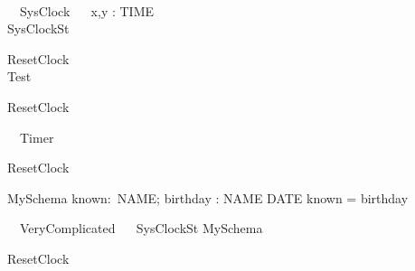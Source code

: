 \documentclass{llncs}
\begin{document}
\begin{circus}
\\
\circprocess\ ~SysClock ~\circdef~ x,y : TIME \circspot \circbegin\\
\circstate SysClockSt 
\end{circus}%
\begin{circusaction}
  ResetClock ~\circdef~\Skip\\
  Test ~\circdef~\Skip
\end{circusaction}
\begin{circus}
  \circspot ResetClock
  \circend
\end{circus}

\begin{circus}%
  \circprocess\ ~Timer ~\circdef~\circbegin
\end{circus}%
\begin{circusaction}
  ResetClock ~\circdef~\Skip
\end{circusaction}
\begin{circus}
  \circspot \Skip
  \circend
\end{circus}
\begin{schema}{MySchema}
known:\power~NAME; 
birthday : NAME \pfun DATE 
\where
known = \dom birthday\\
\end{schema}
\begin{circus}%
  \circprocess\ ~VeryComplicated ~\circdef~\circbegin
  \circstate SysClockSt  MySchema\\

\end{circus}%
\begin{circusaction}
  ResetClock ~\circdef~\Skip
\end{circusaction}
\begin{circus}
  \circspot \Skip
  \circend
\end{circus}
\end{document}
